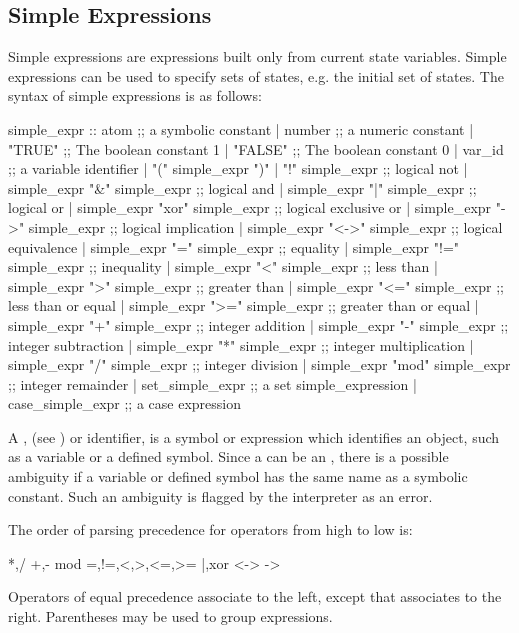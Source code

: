 \subsection{Simple Expressions}
\label{simple expressions}
%
Simple expressions are expressions built only from current state
variables. Simple expressions can be used to specify sets of states,
e.g. the initial set of states. The syntax of simple expressions is as
follows:
%
\begin{Grammar}
simple_expr ::
          atom                           ;; a symbolic constant
        | number                         ;; a numeric constant
        | "TRUE"                         ;; The boolean constant 1
        | "FALSE"                        ;; The boolean constant 0
        | var_id                         ;; a variable identifier
        | "(" simple_expr ")"
        | "!" simple_expr                ;; logical not
        | simple_expr "\&" simple_expr    ;; logical and
        | simple_expr "|" simple_expr    ;; logical or
        | simple_expr "xor" simple_expr  ;; logical exclusive or
        | simple_expr "->" simple_expr   ;; logical implication
        | simple_expr "<->" simple_expr  ;; logical equivalence
        | simple_expr "=" simple_expr    ;; equality
        | simple_expr "!=" simple_expr   ;; inequality
        | simple_expr "<" simple_expr    ;; less than
        | simple_expr ">" simple_expr    ;; greater than
        | simple_expr "<=" simple_expr   ;; less than or equal
        | simple_expr ">=" simple_expr   ;; greater than or equal
        | simple_expr "+" simple_expr    ;; integer addition
        | simple_expr "-" simple_expr    ;; integer subtraction
        | simple_expr "*" simple_expr    ;; integer multiplication
        | simple_expr "/" simple_expr    ;; integer division
        | simple_expr "mod" simple_expr  ;; integer remainder
        | set_simple_expr                ;; a set simple_expression
        | case_simple_expr               ;; a case expression
\end{Grammar}
%
A , (see ) or identifier, is a symbol
or expression which identifies an object, such as a variable or a
defined symbol. Since a  can be an , there is
a possible ambiguity if a variable or defined symbol has the same name
as a symbolic constant. Such an ambiguity is flagged by the
interpreter as an error.

The order of parsing precedence for operators from high to low is:
%
\begin{Grammar}
*,/
+,-
mod
=,!=,<,>,<=,>=
|,xor
<->
->
\end{Grammar}
%
Operators of equal precedence associate to the left, except \code{->}
that associates to the right.  Parentheses may be used to group
expressions.

